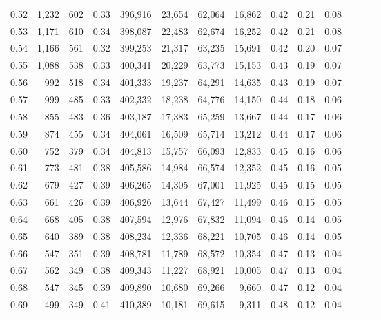 \begin{tabular}{rrrrrrrrrrrrrr}
0.52 &   1,232 &    602 &  0.33 &  396,916 &   23,654 &  62,064 &  16,862 &  0.42 &  0.21 &      0.08 \\
0.53 &   1,171 &    610 &  0.34 &  398,087 &   22,483 &  62,674 &  16,252 &  0.42 &  0.21 &      0.08 \\
0.54 &   1,166 &    561 &  0.32 &  399,253 &   21,317 &  63,235 &  15,691 &  0.42 &  0.20 &      0.07 \\
0.55 &   1,088 &    538 &  0.33 &  400,341 &   20,229 &  63,773 &  15,153 &  0.43 &  0.19 &      0.07 \\
0.56 &     992 &    518 &  0.34 &  401,333 &   19,237 &  64,291 &  14,635 &  0.43 &  0.19 &      0.07 \\
0.57 &     999 &    485 &  0.33 &  402,332 &   18,238 &  64,776 &  14,150 &  0.44 &  0.18 &      0.06 \\
0.58 &     855 &    483 &  0.36 &  403,187 &   17,383 &  65,259 &  13,667 &  0.44 &  0.17 &      0.06 \\
0.59 &     874 &    455 &  0.34 &  404,061 &   16,509 &  65,714 &  13,212 &  0.44 &  0.17 &      0.06 \\
0.60 &     752 &    379 &  0.34 &  404,813 &   15,757 &  66,093 &  12,833 &  0.45 &  0.16 &      0.06 \\
0.61 &     773 &    481 &  0.38 &  405,586 &   14,984 &  66,574 &  12,352 &  0.45 &  0.16 &      0.05 \\
0.62 &     679 &    427 &  0.39 &  406,265 &   14,305 &  67,001 &  11,925 &  0.45 &  0.15 &      0.05 \\
0.63 &     661 &    426 &  0.39 &  406,926 &   13,644 &  67,427 &  11,499 &  0.46 &  0.15 &      0.05 \\
0.64 &     668 &    405 &  0.38 &  407,594 &   12,976 &  67,832 &  11,094 &  0.46 &  0.14 &      0.05 \\
0.65 &     640 &    389 &  0.38 &  408,234 &   12,336 &  68,221 &  10,705 &  0.46 &  0.14 &      0.05 \\
0.66 &     547 &    351 &  0.39 &  408,781 &   11,789 &  68,572 &  10,354 &  0.47 &  0.13 &      0.04 \\
0.67 &     562 &    349 &  0.38 &  409,343 &   11,227 &  68,921 &  10,005 &  0.47 &  0.13 &      0.04 \\
0.68 &     547 &    345 &  0.39 &  409,890 &   10,680 &  69,266 &   9,660 &  0.47 &  0.12 &      0.04 \\
0.69 &     499 &    349 &  0.41 &  410,389 &   10,181 &  69,615 &   9,311 &  0.48 &  0.12 &      0.04 \\

\end{tabular}
